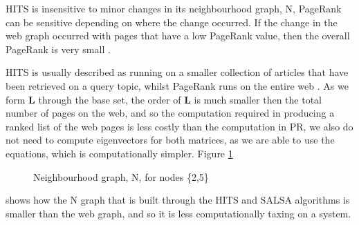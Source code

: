 \documentclass[11pt]{report}
\begin{document}
HITS is insensitive to minor changes in its neighbourhood graph, N, PageRank can be sensitive depending on where the change occurred. If the change in the web graph occurred with pages that have a low PageRank value, then the overall PageRank is very small \cite{ng2001stable}.

HITS is usually described as running on a smaller collection of articles that have been retrieved on a query topic, whilst PageRank runs on the entire web \cite{ng2001link}. As we form \textbf{L} through the base set, the order of \textbf{L} is much smaller then the total number of pages on the web, and so the computation required in producing a ranked list of the web pages is less costly than the computation in PR, we also do not need to compute eigenvectors for both matrices, as we are able to use the equations, which is computationally simpler. Figure \ref{fig:N build}
\begin{figure}[h] 
\centering
{} \qquad\qquad
{}
\caption{Neighbourhood graph, N,  for nodes \{2,5\} } \label{fig:N build}
\end{figure}
 shows how the N graph that is built through the HITS and SALSA algorithms is smaller than the web graph, and so it is less computationally taxing on a system.
\end{document}
